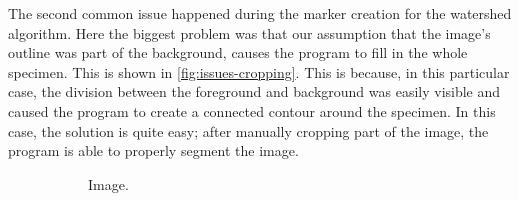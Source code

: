 \documentclass[
  digital,     %
  oneside,     %
  nosansbold,  %
  nocolorbold, %
  lof,         %
  lot,         %
]{fithesis4}
\begin{document}
The second common issue happened during the marker creation for the watershed
algorithm. Here the biggest problem was that our assumption that the image's
outline was part of the background, causes the program to fill in the whole
specimen. This is shown in \ref{fig:issues-cropping}. This is because, in this
particular case, the division between the foreground and background was easily
visible and caused the program to create a connected contour around the
specimen. In this case, the solution is quite easy; after manually cropping part
of the image, the program is able to properly segment the image.

\begin{figure}
    \begin{subfigure}[t]{0.3\textwidth}
        \caption{Image.}
    \end{subfigure}
    \begin{subfigure}[t]{0.3\textwidth}

\end{subfigure}
\end{figure}
\end{document}
